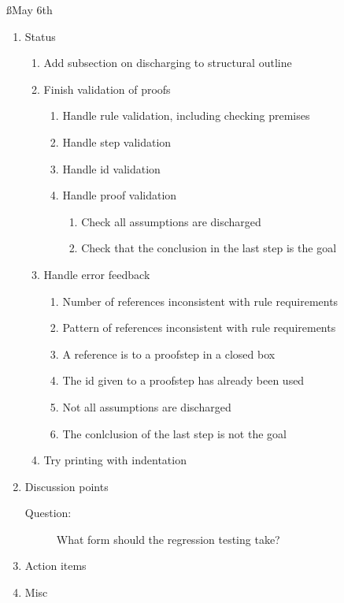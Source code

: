 \documentclass[a4paper]{article}
\begin{document}
\ss{May 6th}
\begin{enumerate}
  \item Status
    \begin{enumerate}[\HollowBox]
      \item Add subsection on discharging to structural outline
      \item Finish validation of proofs
        \begin{enumerate}[\HollowBox]
          \item Handle rule validation, including checking premises
          \item Handle step validation
          \item[\Checkedbox] Handle id validation
          \item Handle proof validation
            \begin{enumerate}[\HollowBox]
              \item[\Checkedbox] Check all assumptions are discharged
              \item[\Checkedbox] Check that the conclusion in the last step
              is the goal
            \end{enumerate}
        \end{enumerate}
      \item Handle error feedback
        \begin{enumerate}[\HollowBox]
          \item Number of references inconsistent with rule requirements
          \item Pattern of references inconsistent with rule requirements
          \item A reference is to a proofstep in a closed box
          \item[\Checkedbox] The id given to a proofstep has already been 
          used
          \item[\Checkedbox] Not all assumptions are discharged
          \item[\Checkedbox] The conlclusion of the last step is not the goal
        \end{enumerate}
      \item Try printing with indentation
    \end{enumerate}
  \item Discussion points
    \begin{description}
      \item[Question:] What form should the regression testing take?
    \end{description}
  \item Action items
  \item Misc
\end{enumerate}
\end{document}
